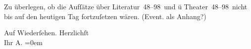 \pstart
           Zu überlegen, ob die Aufſätze über Literatur 48–98 und ü Theater 48–98 nicht bis auf
               den heutigen Tag fortzuſetzen wären. (Event. als Anhang?)\pend
           
\pstart
           Auf Wiederſehen. Herzlichſt {\\[\baselineskip]}Ihr \spacefill\mbox{A.}\pend
           \leftskip=0em{}\endnumbering{}  
      